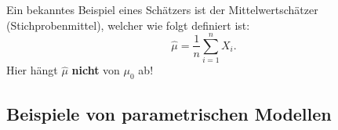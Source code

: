 \documentclass[10pt]{article}
\newenvironment{BSP}[1][]
{\begin{Beispiel}[frametitle=#1]}{\end{Beispiel}}
\begin{document}
	 \begin{BSP}[Beispiel 1.2 (Mittelwertschätzer)]
	 	Ein bekanntes Beispiel eines Schätzers ist der Mittelwertschätzer (Stichprobenmittel), welcher wie folgt definiert ist:
	 	\begin{equation*}
	 			\hat{\mu}=\frac{1}{n}\sum_{i=1}^{n} X_i.
	 	\end{equation*}
	 	Hier hängt $\hat{\mu}$ \textbf{nicht} von $\mu_0$ ab!
	 \end{BSP}
	
	

\pagebreak %
\subsection{Beispiele von parametrischen Modellen}
	
\end{document}
